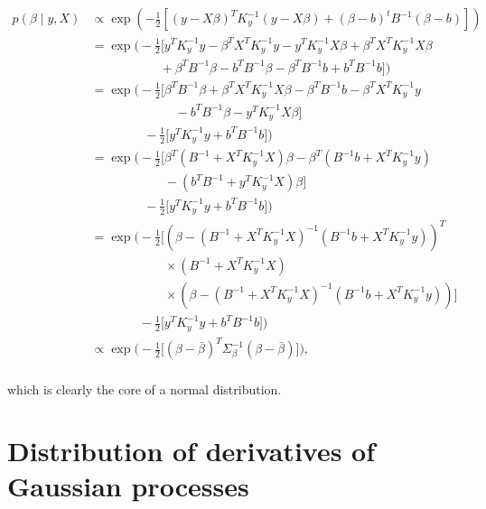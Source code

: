 \documentclass{draft}
\newcommand{\Kyi}{\ensuremath{K_y^{-1}}} %
\newcommand{\Bi}{\ensuremath{B^{-1}}} %
\begin{document}
\begin{align}
    p(\beta \mid y, X)
    & \propto  \exp\left( -\frac{1}{2} \left[ (y - X\beta)^T \Kyi (y - X\beta) + (\beta - b)^t B^{-1} (\beta - b) \right] \right) \\
    & = \exp\biggl( -\frac{1}{2} \biggl[ y^T \Kyi y - \beta^T X^T \Kyi y - y^T \Kyi X \beta + \beta^T X^T \Kyi X \beta \\ \nonumber
    & \phantom{\exp\biggl( -\frac{1}{2} \biggl[ y^T} + \beta^T \Bi \beta - b^T \Bi \beta - \beta^T \Bi b + b^T \Bi b \biggr] \biggr) \\
    & = \exp\biggl( -\frac{1}{2} \biggl[ \beta^T \Bi \beta + \beta^T X^T \Kyi X \beta - \beta^T \Bi b - \beta^T X^T \Kyi y \\ \nonumber
    & \phantom{\exp\biggl(-\frac{1}{2} yyyyy} - b^T \Bi \beta - y^T \Kyi X \beta \biggr] \\ \nonumber
    & \phantom{\exp\biggl(-\frac{1}{2}} -\frac{1}{2} \biggl[ y^T \Kyi y + b^T \Bi b \biggr] \biggr) \\
    & = \exp\biggl( -\frac{1}{2} \biggl[ \beta^T ( \Bi + X^T \Kyi X ) \beta - \beta^T ( \Bi b + X^T \Kyi y ) \\ \nonumber
    & \phantom{= \exp\biggl( -\frac{1}{2} \biggl[} - ( b^T \Bi + y^T \Kyi X ) \beta \biggr] \\ \nonumber
    & \phantom{\exp\biggl(-\frac{1}{2}} -\frac{1}{2} \biggl[ y^T \Kyi y + b^T \Bi b \biggr] \biggr) \\
    & = \exp\biggl( -\frac{1}{2} \biggl[ \left( \beta - ( \Bi + X^T \Kyi X )^{-1} ( \Bi b + X^T \Kyi y ) \right)^T \\ \nonumber
    & \phantom{= \exp \biggl( -\frac{1}{2} \biggl[} \times ( \Bi + X^T \Kyi X )\\ \nonumber
    & \phantom{= \exp \biggl( -\frac{1}{2} \biggl[} \times \left( \beta - ( \Bi + X^T \Kyi X )^{-1} ( \Bi b + X^T \Kyi y ) \right) \biggr] \\ \nonumber
    & \phantom{= \exp \biggl( } -\frac{1}{2} \biggl[ y^T \Kyi y + b^T \Bi b \biggr] \biggr) \\
    & \propto \exp\biggl( -\frac{1}{2} \biggl[ \left( \beta - \bar{\beta} \right)^T \Sigma_\beta^{-1} ( \beta - \bar{\beta} ) \biggr] \biggr), \\ \nonumber
\end{align}

which is clearly the core of a normal distribution.

\section{Distribution of derivatives of Gaussian processes}
\end{document}
